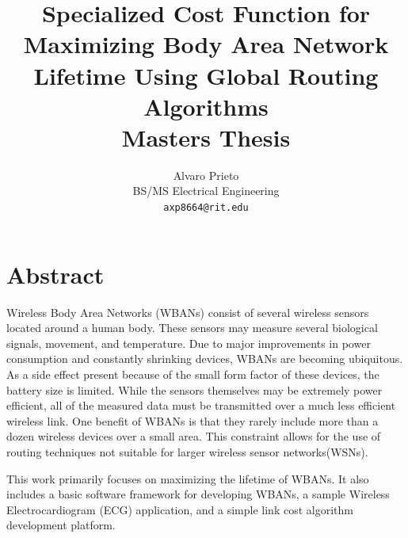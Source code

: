 \documentclass{article}
\begin{document}
\title{Specialized Cost Function for Maximizing Body Area Network Lifetime Using Global Routing Algorithms\\
Masters Thesis}
\author{Alvaro Prieto\\
BS/MS Electrical Engineering\\
\texttt{axp8664@rit.edu}}
\maketitle

\pagebreak

\tableofcontents

\pagebreak

\section*{Abstract}
Wireless Body Area Networks (WBANs) consist of several wireless sensors located around a human body. These sensors may measure several biological signals, movement, and temperature. Due to major improvements in power consumption and constantly shrinking devices, WBANs are becoming ubiquitous. As a side effect present because of the small form factor of these devices, the battery size is limited. While the sensors themselves may be extremely power efficient, all of the measured data must be transmitted over a much less efficient wireless link. One benefit of WBANs is that they rarely include more than a dozen wireless devices over a small area. This constraint allows for the use of routing techniques not suitable for larger wireless sensor networks(WSNs).

This work primarily focuses on maximizing the lifetime of WBANs. It also includes a basic software framework for developing WBANs, a sample Wireless Electrocardiogram (ECG) application, and a simple link cost algorithm development platform.
\end{document}
